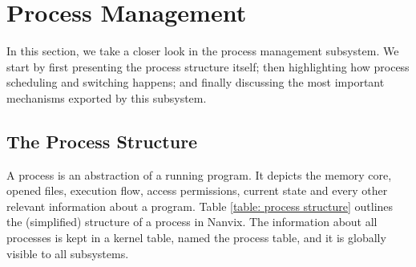 \section{Process Management}

In this section, we take a closer look in the process management
subsystem. We start by first presenting the process structure
itself; then highlighting how process scheduling and switching
happens; and finally discussing the most important mechanisms
exported by this subsystem.

\subsection{The Process Structure}
\label{subsection: the process structure}

	A process is an abstraction of a running program. It depicts the
	memory core, opened files, execution flow, access permissions,
	current state and every other relevant information about a program.
	Table \ref{table: process structure} outlines the (simplified)
	structure of a process in Nanvix. The information about all
	processes is kept in a kernel table, named the process table, and it
	is globally visible to all subsystems.

